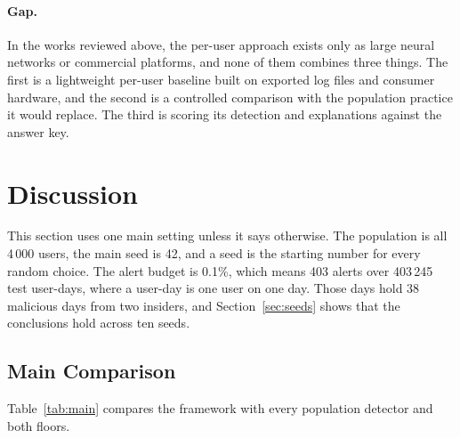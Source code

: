 \documentclass[a4paper,12pt]{article}
\begin{document}
\paragraph{Gap.} In the works reviewed above, the per-user approach exists only as large neural networks or commercial platforms, and none of them combines three things. The first is a lightweight per-user baseline built on exported log files and consumer hardware, and the second is a controlled comparison with the population practice it would replace. The third is scoring its detection and explanations against the answer key.
\section{Discussion}
\label{sec:results}

This section uses one main setting unless it says otherwise. The population is all 4\,000 users, the main seed is 42, and a seed is the starting number for every random choice. The alert budget is 0.1\%, which means 403 alerts over 403\,245 test user-days, where a user-day is one user on one day. Those days hold 38 malicious days from two insiders, and Section~\ref{sec:seeds} shows that the conclusions hold across ten seeds.

\subsection{Main Comparison}
Table~\ref{tab:main} compares the framework with every population detector and both floors.
\end{document}
